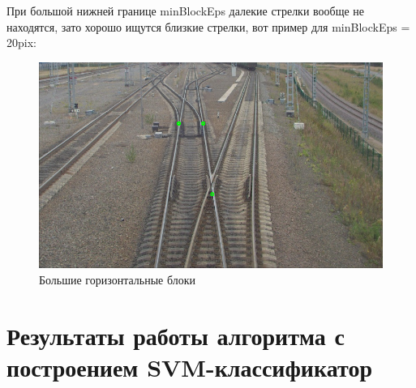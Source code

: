 При большой нижней границе minBlockEps далекие стрелки вообще не находятся, зато хорошо ищутся близкие стрелки, вот пример для minBlockEps = 20pix:
\begin{figure}[!h]
	\centering
	\includegraphics[width=0.7\linewidth]{pictures/45_20.png}
	\caption[]{Большие горизонтальные блоки}
	\label{fig:45_20}
\end{figure}

\section{Результаты работы алгоритма с построением SVM-классификатор}
